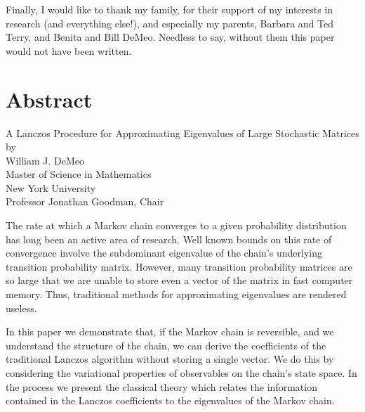 \documentclass[12pt,letterpaper]{report}
\theoremstyle{plain}
\theoremstyle{definition}
\theoremstyle{remark}
\numberwithin{theorem}{chapter}
\numberwithin{claim}{chapter}
\numberwithin{equation}{chapter}
\numberwithin{conjecture}{chapter}
\newcommand\<{\ensuremath{\langle}}
\renewcommand\>{\ensuremath{\rangle}}
\begin{document}
Finally, I would like to thank my family, for their support of my interests in research (and
everything else!), and especially my parents, Barbara and Ted Terry, and Benita and Bill DeMeo.
Needless to say, without them this paper would not have been written.


\newpage
\section*{Abstract}
\begin{center}
\newcommand\skipsize{6pt}
A Lanczos Procedure for Approximating Eigenvalues of Large Stochastic Matrices\\[\skipsize]
by\\[\skipsize]
William J. DeMeo\\[\skipsize]
Master of Science in Mathematics\\[\skipsize]
New York University\\[\skipsize]
Professor Jonathan Goodman, Chair
\end{center}

The rate at which a Markov chain converges to a given probability distribution
has long been an active area of research. Well known bounds on this rate of
convergence involve the subdominant eigenvalue of the chain's underlying
transition probability matrix. However, many transition probability matrices are
so large that we are unable to store even a vector of the matrix in fast
computer memory. Thus, traditional methods for approximating eigenvalues are
rendered useless. 

In this paper we demonstrate that, if the Markov chain is reversible, and we
understand the structure of the chain, we can derive the coefficients of the
traditional Lanczos algorithm without storing a single vector. We do this by
considering the variational properties of observables on the chain's state
space. In the process we present the classical theory which relates the
information contained in the Lanczos coefficients to the eigenvalues of the
Markov chain. 

\newpage
\tableofcontents

\newpage
\end{document}
